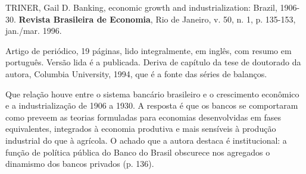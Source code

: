 
\begin{identificacao}
TRINER, Gail D. Banking, economic growth and industrialization: Brazil, 1906-30. \textbf{Revista Brasileira de Economia}, Rio de Janeiro, v. 50, n. 1, p. 135-153, jan./mar. 1996.

Artigo de periódico, 19 páginas, lido integralmente, em inglês, com resumo em português. Versão lida é a publicada. Deriva de capítulo da tese de doutorado da autora, Columbia University, 1994, que é a fonte das séries de balanços.
\end{identificacao}


Que relação houve entre o sistema bancário brasileiro e o crescimento econômico e a industrialização de 1906 a 1930. A resposta é que os bancos se comportaram como preveem as teorias formuladas para economias desenvolvidas em fases equivalentes, integrados à economia produtiva e mais sensíveis à produção industrial do que à agrícola. O achado que a autora destaca é institucional: a função de política pública do Banco do Brasil obscurece nos agregados o dinamismo dos bancos privados (p. 136).


